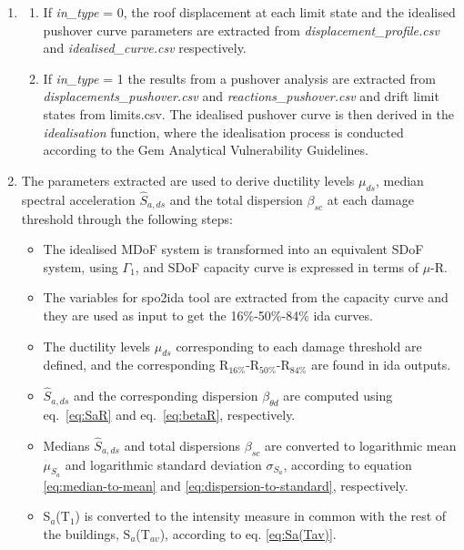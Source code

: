 \begin{enumerate}
\item 
\begin{enumerate}
\item If \textit{in\_type} = 0, the roof displacement at each limit state and the idealised pushover curve parameters are extracted from \textit{displacement\_profile.csv} and \textit{idealised\_curve.csv} respectively.

\item If \textit{in\_type} = 1 the results from a pushover analysis are extracted from \textit{displacements\_pushover.csv} and \textit{reactions\_pushover.csv} and drift limit states from {limits.csv}. The idealised pushover curve is then derived in the \textit{idealisation} function, where the idealisation process is conducted according to the Gem Analytical Vulnerability Guidelines.	\end{enumerate}

\item The parameters extracted are used to derive ductility levels $\mu_{ds}$, median spectral acceleration $\hat{S}_{a,ds}$ and the total dispersion $\beta_{sc}$ at each damage threshold through the following steps:
\begin{itemize}
\item The idealised MDoF system is transformed into an equivalent SDoF system, using $\Gamma_1$, and SDoF capacity curve is  expressed in terms of $\mu$-R.

\item The variables for spo2ida tool are extracted from the capacity curve and they are used as input to get the 16\%-50\%-84\% ida curves.

\item The ductility levels $\mu_{ds}$ corresponding to each damage threshold are defined, and the corresponding R$_{16\%}$-R$_{50\%}$-R$_{84\%}$ are found in ida outputs.

\item $\hat{S}_{a,ds}$ and the corresponding dispersion $\beta_{\theta d}$ are computed using eq.~\ref{eq:SaR} and eq.~\ref{eq:betaR}, respectively.

\item Medians $\hat{S}_{a,ds}$ and total dispersions $\beta_{sc}$ are converted to logarithmic mean $\mu_{S_a}$ and logarithmic standard deviation $\sigma_{S_a}$, according to equation \ref{eq:median-to-mean} and \ref{eq:dispersion-to-standard}, respectively.

\item S$_a$(T$_1$) is converted to the intensity measure in common with the rest of the buildings, S$_a$(T$_{av}$), according to eq. \ref{eq:Sa(Tav)}.


\end{itemize}
\end{enumerate}
